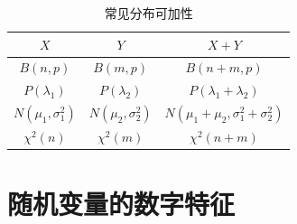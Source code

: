 \begin{table}[ht]
	\centering
	\setlength{\tabcolsep}{10pt}
	\begin{tabular}[h]{c|c|c}
		\hline
		$X$ & $Y$ & $X+Y$\\
		\hline
		$B(n,p)$ & $B(m,p)$ & $B(n+m,p)$\\
		\hline
		$P(\lambda_{1})$ & $P(\lambda_{2})$ & $P(\lambda_{1}+\lambda_{2})$\\
		\hline
		$N(\mu_{1},\sigma_{1}^2)$ & $N(\mu_{2},\sigma_{2}^2)$ & $N(\mu_{1}+\mu_{2},\sigma_{1}^2+\sigma_{2}^2)$\\
		\hline
		$\chi^2(n)$ & $\chi^2(m)$ & $\chi^2(n+m)$\\
 		\hline
	\end{tabular}
	\caption{常见分布可加性}
	\label{table: "常见分布可加性"}
\end{table}
\chapter{随机变量的数字特征}
